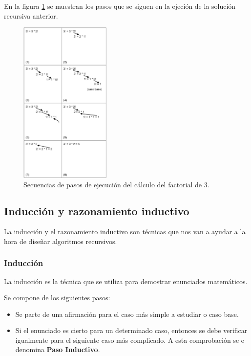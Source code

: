 \documentclass[a4paper, 11pt, titlepage]{article}
\begin{document}
            En la figura \ref{factorial3} se muestran los pasos que se siguen en la ejeción de la solución recursiva 
            anterior.

            \begin{figure}[htp]
                \centering
                \includegraphics[width=0.4\textwidth]{resources/recursividad01.png}
                \caption{Secuencias de pasos de ejecución del cálculo del factorial de 3.}
                \label{factorial3}
            \end{figure}

    \subsection{Inducción y razonamiento inductivo}

        La inducción y el razonamiento inductivo son técnicas que nos van a ayudar a la hora de 
        diseñar algoritmos recursivos.

        \subsubsection{Inducción}

            La inducción es la técnica que se utiliza para demostrar enunciados matemáticos.

            Se compone de los siguientes pasos:

            \begin{itemize}
                \item Se parte de una afirmación para el caso más simple a estudiar o caso base.
                \item Si el enunciado es cierto para un determinado caso, entonces se debe verificar
                igualmente para el siguiente caso más complicado. A esta comprobación se e denomina 
                \textbf{Paso Inductivo}.
            \end{itemize}
\end{document}
